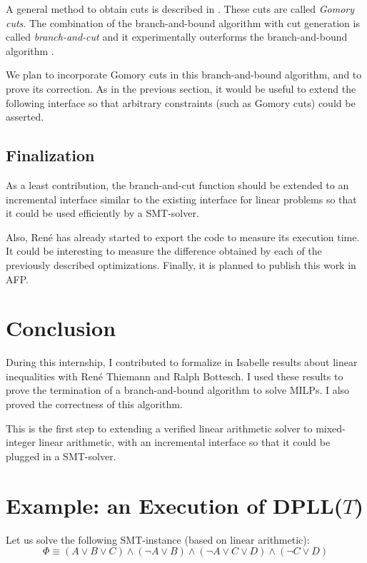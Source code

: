 \documentclass{article}
\begin{document}
A general method to obtain cuts is described in \cite[Section 4]{Dutertre2006}.
These cuts are called \textit{Gomory cuts}. The combination of the
branch-and-bound algorithm with cut generation is called
\textit{branch-and-cut} and it experimentally outerforms the branch-and-bound
algorithm \cite{Ongoing2012}.

We plan to incorporate Gomory cuts in this branch-and-bound algorithm,
and to prove its correction. As in the previous section, it would
be useful to extend the following interface so that arbitrary constraints (such
as Gomory cuts) could be asserted.

\subsection{Finalization}
As a least contribution, the branch-and-cut function should be extended to an
incremental interface similar to the existing interface for linear problems so
that it could be used efficiently by a SMT-solver.

Also, René has already started to export the code to measure its execution
time. It could be interesting to measure the difference obtained by each of the
previously described optimizations. Finally, it is planned to publish this
work in AFP.

\pagebreak

\section*{Conclusion}
During this internship, I contributed to formalize in Isabelle results about
linear inequalities with René Thiemann and Ralph Bottesch. I used these results
to prove the termination of a branch-and-bound algorithm to solve MILPs. I also
proved the correctness of this algorithm.

This is the first step to extending a verified linear arithmetic solver to
mixed-integer linear arithmetic, with an incremental interface so that it could
be plugged in a SMT-solver.




\appendix

\section{Example: an Execution of DPLL($T$)}
\label{dpll}
Let us solve the following SMT-instance (based on linear arithmetic):
$$\Phi \equiv (A \vee B \vee C) \wedge (\neg A \vee B) \wedge
              (\neg A \vee C \vee D) \wedge (\neg C \vee D)$$
\end{document}
